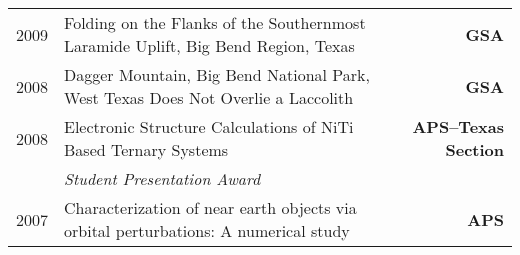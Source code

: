 \documentclass[10pt,letterpaper]{moderncv}
\begin{document}
\begin{tabularx}{\textwidth}{p{.33in}X>{\bfseries}r}

	  2009 & Folding on the Flanks of the Southernmost Laramide Uplift, Big Bend Region, Texas & GSA \\

	  2008 & Dagger Mountain, Big Bend National Park, West Texas Does Not Overlie a Laccolith & GSA \\

	 2008 & Electronic Structure Calculations of NiTi Based Ternary Systems  & APS--Texas Section \\
	 & \emph{Student Presentation Award} & \\

	 2007 & Characterization of near earth objects via orbital perturbations: A numerical study & APS

\end{tabularx}



\end{document}
